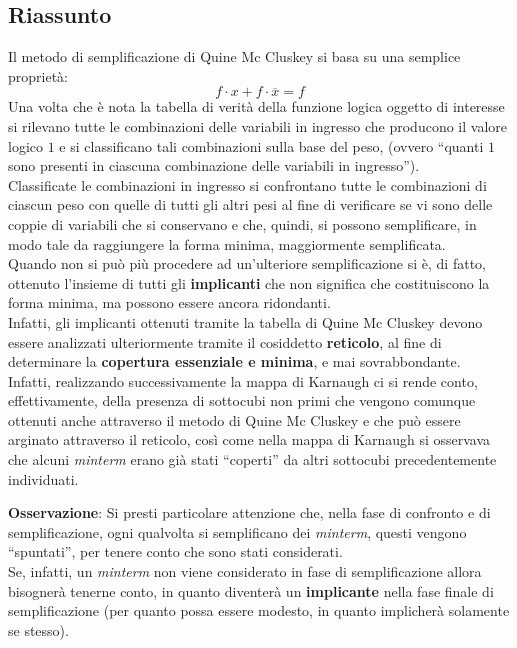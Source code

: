 \documentclass[a4paper]{extarticle}
\newcommand{\quotes}[1]{``#1''}
\begin{document}
\subsection{Riassunto}
Il metodo di semplificazione di Quine Mc Cluskey si basa su una semplice proprietà:
\[f \cdot x + f \cdot \overline{x} = f\]
Una volta che è nota la tabella di verità della funzione logica oggetto di interesse si rilevano tutte le combinazioni delle variabili in ingresso che producono il valore logico \(1\) e si classificano tali combinazioni sulla base del peso, (ovvero \quotes{quanti \(1\) sono presenti in ciascuna combinazione delle variabili in ingresso}).\\
Classificate le combinazioni in ingresso si confrontano tutte le combinazioni di ciascun peso con quelle di tutti gli altri pesi al fine di verificare se vi sono delle coppie di variabili che si conservano e che, quindi, si possono semplificare, in modo tale da raggiungere la forma minima, maggiormente semplificata.\\
Quando non si può più procedere ad un'ulteriore semplificazione si è, di fatto, ottenuto l'insieme di tutti gli \textbf{implicanti} che non significa che costituiscono la forma minima, ma possono essere ancora ridondanti.\\
Infatti, gli implicanti ottenuti tramite la tabella di Quine Mc Cluskey devono essere analizzati ulteriormente tramite il cosiddetto \textbf{reticolo}, al fine di determinare la \textbf{copertura essenziale e minima}, e mai sovrabbondante.\\
Infatti, realizzando successivamente la mappa di Karnaugh ci si rende conto, effettivamente, della presenza di sottocubi non primi che vengono comunque ottenuti anche attraverso il metodo di Quine Mc Cluskey e che può essere arginato attraverso il reticolo, così come nella mappa di Karnaugh si osservava che alcuni \textit{minterm} erano già stati \quotes{coperti} da altri sottocubi precedentemente individuati.

\vspace{1em}
\noindent
\textbf{Osservazione}: Si presti particolare attenzione che, nella fase di confronto e di semplificazione, ogni qualvolta si semplificano dei \textit{minterm}, questi vengono \quotes{spuntati}, per tenere conto che sono stati considerati.\\
Se, infatti, un \textit{minterm} non viene considerato in fase di semplificazione allora bisognerà tenerne conto, in quanto diventerà un \textbf{implicante} nella fase finale di semplificazione (per quanto possa essere modesto, in quanto implicherà solamente se stesso).
\end{document}
